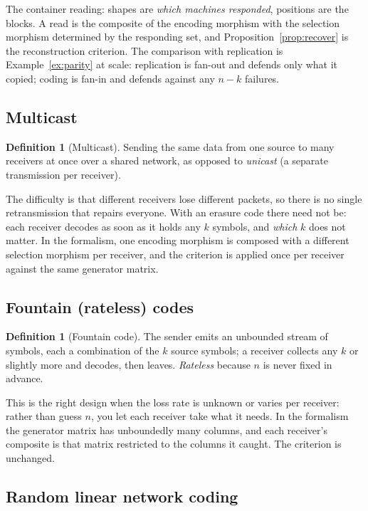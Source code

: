\documentclass[11pt,a4paper]{article}
\theoremstyle{definition}
\newtheorem{definition}[theorem]{Definition}
\theoremstyle{remark}
\begin{document}
The container reading: shapes are \emph{which machines responded}, positions are the
blocks. A read is the composite of the encoding morphism with the selection morphism
determined by the responding set, and Proposition~\ref{prop:recover} is the
reconstruction criterion. The comparison with replication is
Example~\ref{ex:parity} at scale: replication is fan-out and defends only what it
copied; coding is fan-in and defends against any $n-k$ failures.

\subsection{Multicast}

\begin{definition}[Multicast]
Sending the same data from one source to many receivers at once over a shared
network, as opposed to \emph{unicast} (a separate transmission per receiver).
\end{definition}

The difficulty is that different receivers lose different packets, so there is no
single retransmission that repairs everyone. With an erasure code there need not be:
each receiver decodes as soon as it holds any $k$ symbols, and \emph{which} $k$ does
not matter. In the formalism, one encoding morphism is composed with a different
selection morphism per receiver, and the criterion is applied once per receiver
against the same generator matrix.

\subsection{Fountain (rateless) codes}

\begin{definition}[Fountain code]
The sender emits an unbounded stream of symbols, each a combination of the $k$ source
symbols; a receiver collects any $k$ or slightly more and decodes, then leaves.
\emph{Rateless} because $n$ is never fixed in advance.
\end{definition}

This is the right design when the loss rate is unknown or varies per receiver: rather
than guess $n$, you let each receiver take what it needs. In the formalism the
generator matrix has unboundedly many columns, and each receiver's composite is that
matrix restricted to the columns it caught. The criterion is unchanged.

\subsection{Random linear network coding}
\end{document}
